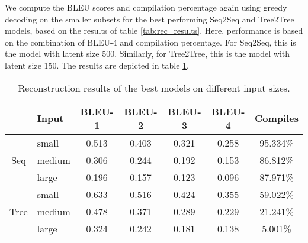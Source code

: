  

We compute the BLEU scores and compilation percentage again using greedy decoding on the smaller subsets for the best performing Seq2Seq and Tree2Tree models, based on the results of table \ref{tab:rec_results}. Here, performance is based on the combination of BLEU-4 and compilation percentage. For Seq2Seq, this is the model with latent size 500. Similarly, for Tree2Tree, this is the model with latent size 150. The results are depicted in table \ref{tab:rec_results_in\prob_sizes}.






\begin{table}[ht!]
\centering
\begingroup
\setlength{\tabcolsep}{3pt} %
\renewcommand{\arraystretch}{1.4} %
\begin{tabular}{clccccc}
 & \textbf{Input} & \textbf{BLEU-1} & \textbf{BLEU-2} & \textbf{BLEU-3} & \textbf{BLEU-4} & \textbf{Compiles}\\ \hline
\multirow{3}{*}{Seq}    &   small   &   0.513  &    0.403    &      0.321    &  0.258      &  95.334\%     \\
                            &   medium   &  0.306      &    0.244        &      0.192     & 0.153      & 86.812\% \\
                            &   large   &    0.196   &      0.157   &   0.123       &   0.096       &  87.971\% \\ \hline
\multirow{3}{*}{Tree}  &   small   &   0.633  &    0.516     &     0.424     &     0.355      &  59.022\%                \\
                            &   medium   &   0.478  &   0.371        &          0.289 &     0.229   & 21.241\%            \\
                            &   large   &  0.324 &      0.242  & 0.181    &    0.138     &    5.001\%         \\ 
\end{tabular}
\endgroup
\caption{Reconstruction results of the best models on different input sizes.}
\label{tab:rec_results_in\prob_sizes}
\end{table}




